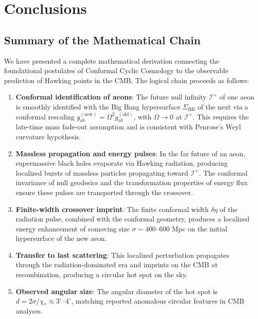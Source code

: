 \documentclass[11pt,a4paper]{article}
\theoremstyle{plain}
\theoremstyle{definition}
\theoremstyle{remark}
\newcommand{\scriplus}{\mathcal{I}^+}
\newcommand{\sigmabb}{\Sigma_{\mathrm{BB}}}
\begin{document}
\section{Conclusions}\label{sec:conclusions}

\subsection{Summary of the Mathematical Chain}

We have presented a complete mathematical derivation connecting the foundational postulates of Conformal Cyclic Cosmology to the observable prediction of Hawking points in the CMB. The logical chain proceeds as follows:

\begin{enumerate}
    \item \textbf{Conformal identification of aeons}: The future null infinity $\scriplus$ of one aeon is smoothly identified with the Big Bang hypersurface $\sigmabb$ of the next via a conformal rescaling $g_{ab}^{(\text{new})} = \Omega^2 g_{ab}^{(\text{old})}$, with $\Omega \to 0$ at $\scriplus$. This requires the late-time mass fade-out assumption and is consistent with Penrose's Weyl curvature hypothesis.
    
    \item \textbf{Massless propagation and energy pulses}: In the far future of an aeon, supermassive black holes evaporate via Hawking radiation, producing localized bursts of massless particles propagating toward $\scriplus$. The conformal invariance of null geodesics and the transformation properties of energy flux ensure these pulses are transported through the crossover.
    
    \item \textbf{Finite-width crossover imprint}: The finite conformal width $\delta\eta$ of the radiation pulse, combined with the conformal geometry, produces a localized energy enhancement of comoving size $\sigma \sim 400$--$600$ Mpc on the initial hypersurface of the new aeon.
    
    \item \textbf{Transfer to last scattering}: This localized perturbation propagates through the radiation-dominated era and imprints on the CMB at recombination, producing a circular hot spot on the sky.
    
    \item \textbf{Observed angular size}: The angular diameter of the hot spot is $d = 2\sigma/\chi_\ast \approx 3^\circ$--$4^\circ$, matching reported anomalous circular features in CMB analyses.
\end{enumerate}
\end{document}
